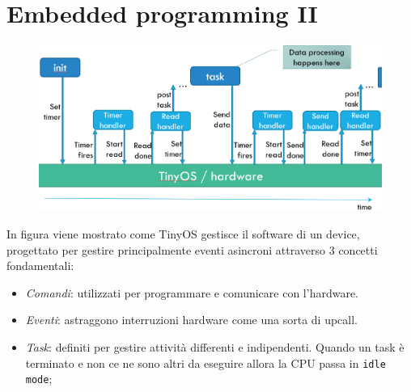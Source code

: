 \section{Embedded programming II}

\begin{figure}[htbp]
   \centering
   \includegraphics{images/questions/Schermata del 2023-10-19 15-47-07.png}
   \label{fig:dom15}
\end{figure}

In figura viene mostrato come TinyOS gestisce il software di un device, progettato per gestire principalmente eventi asincroni attraverso 3 concetti fondamentali:

\begin{itemize}
\item \textit{Comandi}: utilizzati per programmare e comunicare con l'hardware.
\item \textit{Eventi}: astraggono interruzioni hardware come una sorta di upcall.
\item \textit{Task}: definiti per gestire attività differenti e indipendenti. Quando un task è terminato e non ce ne sono altri da eseguire allora la CPU passa in \texttt{idle mode};
\end{itemize}


